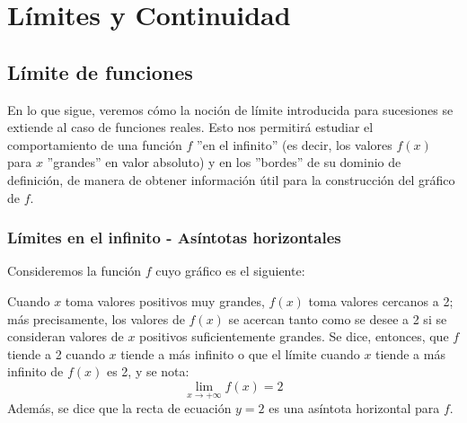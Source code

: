 \documentclass[../teoria.root.tex]{subfiles}
\begin{document}
\section{Límites y Continuidad}
\subsection{Límite de funciones}
En lo que sigue, veremos cómo la noción de límite introducida para sucesiones se extiende al caso de funciones reales.
Esto nos permitirá estudiar el comportamiento de una función \(f\) ”en el infinito” (es decir, los valores \(f(x)\) para \(x\) ”grandes” en valor absoluto) y en los ”bordes” de su dominio de definición, de manera de obtener información útil para la construcción del gráfico de \(f\).
\subsubsection{Límites en el infinito - Asíntotas horizontales}
Consideremos la función \(f\) cuyo gráfico es el siguiente:
\begin{center}
\end{center}
Cuando \(x\) toma valores positivos muy grandes, \(f(x)\) toma valores cercanos a 2;
más precisamente, los valores de \(f(x)\) se acercan tanto como se desee a 2 si se consideran valores de \(x\) positivos suficientemente grandes.
Se dice, entonces, que \(f\) tiende a 2 cuando \(x\) tiende a más infinito o que el límite cuando \(x\) tiende a más infinito de \(f(x)\) es 2, y se nota:
\[\lim_{x\to+\infty}f(x)=2\]
Además, se dice que la recta de ecuación \(y=2\) es una asíntota horizontal para \(f\).
\end{document}
